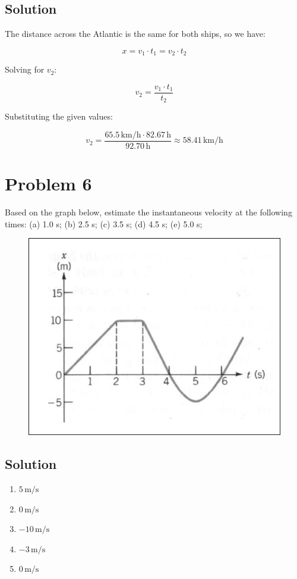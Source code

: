 \documentclass{article}
\newcommand{\kilo}{\text{k}}
\newcommand{\meter}{\text{m}}
\newcommand{\second}{\text{s}}
\begin{document}
\subsection*{Solution}
The distance across the Atlantic is the same for both ships, so we have:

\[
x = v_1 \cdot t_1 = v_2 \cdot t_2
\]

Solving for \( v_2 \):

\[
v_2 = \frac{v_1 \cdot t_1}{t_2}
\]

Substituting the given values:

\[
v_2 = \frac{65.5 \, \si{\kilo\meter\per\hour} \cdot 82.67 \, \si{\hour}}{92.70 \, \si{\hour}} \approx 58.41 \, \si{\kilo\meter\per\hour}
\]

\section*{Problem 6}
Based on the graph below, estimate the instantaneous velocity at the following times: (a) 1.0 s; (b) 2.5 s; (c) 3.5 s; (d) 4.5 s; (e) 5.0 s;

\begin{figure}[h]
    \centering
    \includegraphics[scale=0.5]{graph.png}
    \label{fig:my_graph}
\end{figure}

\subsection*{Solution}

\begin{enumerate}[label=(\alph*)]
    \item \(5 \, \si{\meter\per\second}\)
    \item \(0 \, \si{\meter\per\second}\)
    \item \(-10 \, \si{\meter\per\second}\)
    \item \(-3 \, \si{\meter\per\second}\)
    \item \(0 \, \si{\meter\per\second}\)
\end{enumerate}
\end{document}
